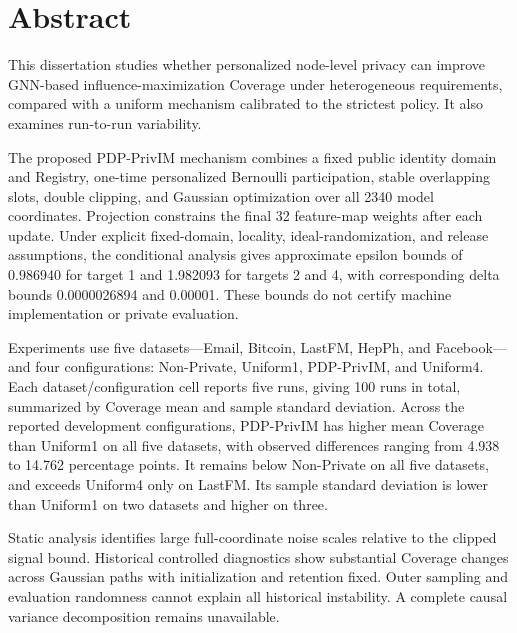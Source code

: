 \chapter*{Abstract}
This dissertation studies whether personalized node-level privacy can improve GNN-based influence-maximization Coverage under heterogeneous requirements, compared with a uniform mechanism calibrated to the strictest policy. It also examines run-to-run variability.

The proposed PDP-PrivIM mechanism combines a fixed public identity domain and Registry, one-time personalized Bernoulli participation, stable overlapping slots, double clipping, and Gaussian optimization over all 2340 model coordinates. Projection constrains the final 32 feature-map weights after each update. Under explicit fixed-domain, locality, ideal-randomization, and release assumptions, the conditional analysis gives approximate epsilon bounds of 0.986940 for target 1 and 1.982093 for targets 2 and 4, with corresponding delta bounds 0.0000026894 and 0.00001. These bounds do not certify machine implementation or private evaluation.

Experiments use five datasets---Email, Bitcoin, LastFM, HepPh, and Facebook---and four configurations: Non-Private, Uniform1, PDP-PrivIM, and Uniform4. Each dataset/configuration cell reports five runs, giving 100 runs in total, summarized by Coverage mean and sample standard deviation. Across the reported development configurations, PDP-PrivIM has higher mean Coverage than Uniform1 on all five datasets, with observed differences ranging from 4.938 to 14.762 percentage points. It remains below Non-Private on all five datasets, and exceeds Uniform4 only on LastFM. Its sample standard deviation is lower than Uniform1 on two datasets and higher on three.

Static analysis identifies large full-coordinate noise scales relative to the clipped signal bound. Historical controlled diagnostics show substantial Coverage changes across Gaussian paths with initialization and retention fixed. Outer sampling and evaluation randomness cannot explain all historical instability. A complete causal variance decomposition remains unavailable.
\clearpage
